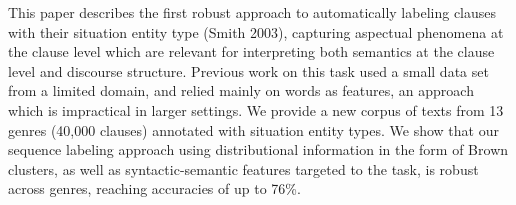 This paper describes the first robust approach to automatically labeling clauses with their situation entity type (Smith 2003), capturing aspectual phenomena at the clause level which are relevant for interpreting both semantics at the clause level and discourse structure. Previous work on this task used a small data set from a limited domain, and relied mainly on words as features, an approach which is impractical in larger settings. We provide a new corpus of texts from 13 genres (40,000 clauses) annotated with situation entity types. We show that our sequence labeling approach using distributional information in the form of Brown clusters, as well as syntactic-semantic features targeted to the task, is robust across genres, reaching accuracies of up to 76\%.
